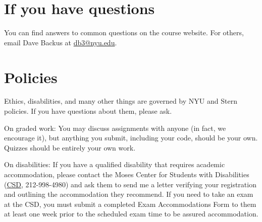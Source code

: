 \documentclass[11pt]{article}
\begin{document}
\section*{If you have questions}

You can find answers to common questions on the course website. 
%
%
For others, email Dave Backus at
\href{mailto:db3@nyu.edu}{db3@nyu.edu}.



\section*{Policies}

Ethics, disabilities, and many other things are governed by NYU
and Stern policies.
If you have questions about them, please ask.

On graded work:
You may discuss assignments with anyone (in fact, we encourage it),
but anything you submit, including your code, should be your own.
Quizzes should be entirely your own work.

On disabilities:
If you have a qualified disability that requires academic accommodation,
please contact the Moses Center for Students with Disabilities
(\href{http://www.nyu.edu/life/safety-health-wellness/students-with-disabilities.html}{CSD},
212-998-4980) and ask them to
send me a letter verifying your registration and outlining the accommodation they recommend.
If you need to take an exam at the CSD,
you must submit a completed Exam Accommodations Form to them
at least one week prior to the scheduled exam time to be assured accommodation.



\end{document}
